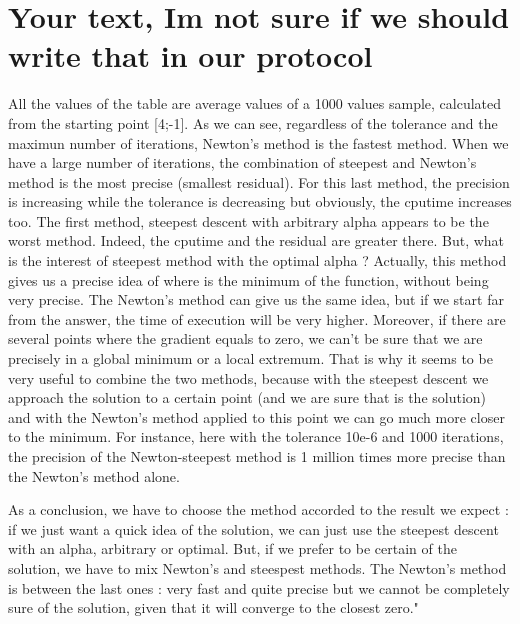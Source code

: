 \documentclass[a4paper,12pt]{article}
\begin{document}
\section{Your text, Im not sure if we should write that in our protocol}
All the values of the table are average values of a 1000 values sample, calculated from the starting point [4;-1].
As we can see, regardless of the tolerance and the maximun number of iterations, Newton's method is the fastest method. 
When we have a large number of iterations, the combination of steepest and Newton's method is the most precise (smallest residual). 
For this last method, the precision is increasing while the tolerance is decreasing but obviously, the cputime increases too.
The first method, steepest descent with arbitrary alpha appears to be the worst method. Indeed, the cputime and the residual are greater there. 
But, what is the interest of steepest method with the optimal alpha ? 
Actually, this method gives us a precise idea of where is the minimum of the function, without being very precise. 
The Newton's method can give us the same idea, but if we start far from the answer, the time of execution will be very higher. 
Moreover, if there are several points where the gradient equals to zero, we can't be sure that we are precisely in a global minimum or a local extremum. 
That is why it seems to be very useful to combine the two methods, because with the steepest descent we approach the solution to a certain point (and we are sure that is the solution) and with the Newton's method applied to this point we can go much more closer to the minimum. 
For instance, here with the tolerance 10e-6 and 1000 iterations, the precision of the Newton-steepest method is 1 million times more precise than the Newton's method alone. 


 As a conclusion, we have to choose the method accorded to the result we expect :
 if we just want a quick idea of the solution, we can just use the steepest descent with an alpha, arbitrary or optimal. But, if we prefer to be certain of the solution, we have to mix Newton's and steespest methods.
The Newton's method is between the last ones : 
very fast and quite precise but we cannot be completely sure of the solution, given that it will converge to the closest zero." 
\end{document}
